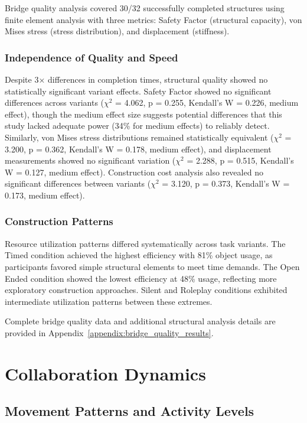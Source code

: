 Bridge quality analysis covered 30/32 successfully completed structures using finite element analysis with three metrics: Safety Factor (structural capacity), von Mises stress (stress distribution), and displacement (stiffness).

\subsubsection{Independence of Quality and Speed}

Despite 3× differences in completion times, structural quality showed no statistically significant variant effects. Safety Factor showed no significant differences across variants ($\chi^2$ = 4.062, p = 0.255, Kendall's W = 0.226, medium effect), though the medium effect size suggests potential differences that this study lacked adequate power (34\% for medium effects) to reliably detect. Similarly, von Mises stress distributions remained statistically equivalent ($\chi^2$ = 3.200, p = 0.362, Kendall's W = 0.178, medium effect), and displacement measurements showed no significant variation ($\chi^2$ = 2.288, p = 0.515, Kendall's W = 0.127, medium effect). Construction cost analysis also revealed no significant differences between variants ($\chi^2$ = 3.120, p = 0.373, Kendall's W = 0.173, medium effect).

\subsubsection{Construction Patterns}

Resource utilization patterns differed systematically across task variants. The Timed condition achieved the highest efficiency with 81\% object usage, as participants favored simple structural elements to meet time demands. The Open Ended condition showed the lowest efficiency at 48\% usage, reflecting more exploratory construction approaches. Silent and Roleplay conditions exhibited intermediate utilization patterns between these extremes.

Complete bridge quality data and additional structural analysis details are provided in Appendix~\ref{appendix:bridge_quality_results}.

\section{Collaboration Dynamics}

\subsection{Movement Patterns and Activity Levels}\label{sec:movement}

